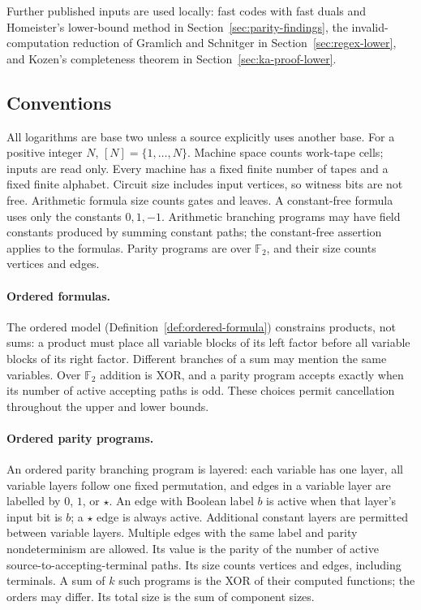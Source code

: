 \documentclass[11pt]{article}
\theoremstyle{definition}
\theoremstyle{remark}
\begin{document}
Further published inputs are used locally: fast codes with fast duals
\cite{BR26,BIR26} and Homeister's lower-bound method \cite{Homeister03}
in Section~\ref{sec:parity-findings}, the invalid-computation reduction
of Gramlich and Schnitger \cite{GS05} in Section~\ref{sec:regex-lower},
and Kozen's completeness theorem \cite{Kozen94} in
Section~\ref{sec:ka-proof-lower}.

\subsection{Conventions}
\label{sec:conventions}

All logarithms are base two unless a source explicitly uses another
base. For a positive integer $N$, $[N]=\{1,\ldots,N\}$. Machine space counts work-tape cells; inputs are read only.
Every machine has a fixed finite number of tapes and a fixed finite
alphabet. Circuit size includes input vertices, so witness bits are
not free. Arithmetic formula size counts gates and leaves. A
constant-free formula uses only the constants $0,1,-1$. Arithmetic
branching programs may have field constants produced by summing
constant paths; the constant-free assertion applies to the formulas.
Parity programs are over $\mathbb F_2$, and their size counts vertices
and edges.

\paragraph{Ordered formulas.}
The ordered model (Definition~\ref{def:ordered-formula}) constrains
products, not sums: a product must place all variable blocks of its
left factor before all variable blocks of its right factor. Different
branches of a sum may mention the same variables. Over $\mathbb F_2$
addition is XOR, and a parity program accepts exactly when its number
of active accepting paths is odd. These choices permit cancellation
throughout the upper and lower bounds.

\paragraph{Ordered parity programs.}
An ordered parity branching program is layered: each variable
has one layer, all variable layers follow one fixed permutation, and
edges in a variable layer are labelled by $0$, $1$, or $\star$.
An edge with Boolean label $b$ is active when that layer's input bit
is $b$; a $\star$ edge is always active. Additional constant layers
are permitted between variable layers. Multiple edges with the same
label and parity nondeterminism are allowed. Its value is the parity
of the number of active source-to-accepting-terminal paths.
Its size counts vertices and edges, including terminals.
A sum of $k$ such programs is the XOR of their computed functions; the
orders may differ. Its total size is the sum of component sizes.
\end{document}

